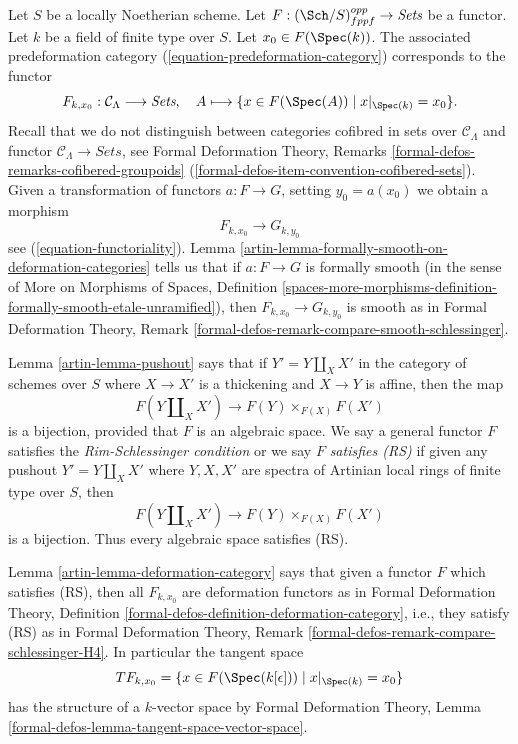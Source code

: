 \medskip\noindent
Let $S$ be a locally Noetherian scheme. Let
$F : (\Sch/S)_{fppf}^{opp} \to \textit{Sets}$ be a functor. Let $k$ be
a field of finite type over $S$. Let $x_0 \in F(\Spec(k))$.
The associated predeformation category (\ref{equation-predeformation-category})
corresponds to the functor
$$
F_{k, x_0} : \mathcal{C}_\Lambda \longrightarrow \textit{Sets},
\quad
A \longmapsto \{x \in F(\Spec(A)) \mid x|_{\Spec(k)} = x_0 \}.
$$
Recall that we do not distinguish between
categories cofibred in sets over $\mathcal{C}_\Lambda$
and functor $\mathcal{C}_\Lambda \to \textit{Sets}$,
see Formal Deformation Theory, Remarks
\ref{formal-defos-remarks-cofibered-groupoids}
(\ref{formal-defos-item-convention-cofibered-sets}).
Given a transformation of functors $a : F \to G$, setting
$y_0 = a(x_0)$ we obtain a morphism
$$
F_{k, x_0} \longrightarrow G_{k, y_0}
$$
see (\ref{equation-functoriality}).
Lemma \ref{artin-lemma-formally-smooth-on-deformation-categories} tells us that if
$a : F \to G$ is formally smooth (in the sense of
More on Morphisms of Spaces, Definition
\ref{spaces-more-morphisms-definition-formally-smooth-etale-unramified}), then
$F_{k, x_0} \longrightarrow G_{k, y_0}$ is smooth as
in Formal Deformation Theory, Remark
\ref{formal-defos-remark-compare-smooth-schlessinger}.

\medskip\noindent
Lemma \ref{artin-lemma-pushout} says that if $Y' = Y \amalg_X X'$ in the
category of schemes over $S$ where $X \to X'$ is a thickening and
$X \to Y$ is affine, then the map
$$
F(Y \amalg_X X') \to F(Y) \times_{F(X)} F(X')
$$
is a bijection, provided that $F$ is an algebraic space.
We say a general functor $F$ satisfies the {\it Rim-Schlessinger condition}
or we say $F$ {\it satisfies (RS)} if given any
pushout $Y' = Y \amalg_X X'$ where $Y, X, X'$ are spectra of Artinian
local rings of finite type over $S$, then
$$
F(Y \amalg_X X') \to F(Y) \times_{F(X)} F(X')
$$
is a bijection. Thus every algebraic space satisfies (RS).

\medskip\noindent
Lemma \ref{artin-lemma-deformation-category} says that
given a functor $F$ which satisfies (RS), then all $F_{k, x_0}$
are deformation functors as in
Formal Deformation Theory, Definition
\ref{formal-defos-definition-deformation-category}, i.e., they satisfy
(RS) as in
Formal Deformation Theory, Remark
\ref{formal-defos-remark-compare-schlessinger-H4}.
In particular the tangent space
$$
TF_{k, x_0} = \{x \in F(\Spec(k[\epsilon])) \mid x|_{\Spec(k)} = x_0\}
$$
has the structure of a $k$-vector space by Formal Deformation Theory,
Lemma \ref{formal-defos-lemma-tangent-space-vector-space}.


